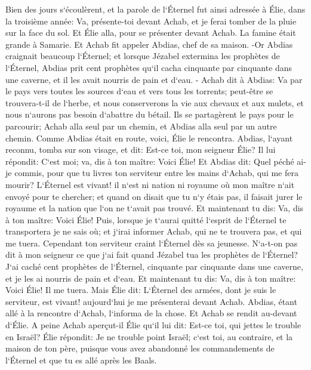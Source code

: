 \verse Bien des jours s`écoulèrent, et la parole de l`Éternel fut ainsi adressée à Élie, dans la troisième année: Va, présente-toi devant Achab, et je ferai tomber de la pluie sur la face du sol. 
\verse Et Élie alla, pour se présenter devant Achab. La famine était grande à Samarie. 
\verse Et Achab fit appeler Abdias, chef de sa maison. -Or Abdias craignait beaucoup l`Éternel; 
\verse et lorsque Jézabel extermina les prophètes de l`Éternel, Abdias prit cent prophètes qu`il cacha cinquante par cinquante dans une caverne, et il les avait nourris de pain et d`eau. - 
\verse Achab dit à Abdias: Va par le pays vers toutes les sources d`eau et vers tous les torrents; peut-être se trouvera-t-il de l`herbe, et nous conserverons la vie aux chevaux et aux mulets, et nous n`aurons pas besoin d`abattre du bétail. 
\verse Ils se partagèrent le pays pour le parcourir; Achab alla seul par un chemin, et Abdias alla seul par un autre chemin. 
\verse Comme Abdias était en route, voici, Élie le rencontra. Abdias, l`ayant reconnu, tomba sur son visage, et dit: Est-ce toi, mon seigneur Élie? 
\verse Il lui répondit: C`est moi; va, dis à ton maître: Voici Élie! 
\verse Et Abdias dit: Quel péché ai-je commis, pour que tu livres ton serviteur entre les mains d`Achab, qui me fera mourir? 
\verse L`Éternel est vivant! il n`est ni nation ni royaume où mon maître n`ait envoyé pour te chercher; et quand on disait que tu n`y étais pas, il faisait jurer le royaume et la nation que l`on ne t`avait pas trouvé. 
\verse Et maintenant tu dis: Va, dis à ton maître: Voici Élie! 
\verse Puis, lorsque je t`aurai quitté l`esprit de l`Éternel te transportera je ne sais où; et j`irai informer Achab, qui ne te trouvera pas, et qui me tuera. Cependant ton serviteur craint l`Éternel dès sa jeunesse. 
\verse N`a-t-on pas dit à mon seigneur ce que j`ai fait quand Jézabel tua les prophètes de l`Éternel? J`ai caché cent prophètes de l`Éternel, cinquante par cinquante dans une caverne, et je les ai nourris de pain et d`eau. 
\verse Et maintenant tu dis: Va, dis à ton maître: Voici Élie! Il me tuera. 
\verse Mais Élie dit: L`Éternel des armées, dont je suis le serviteur, est vivant! aujourd`hui je me présenterai devant Achab. 
\verse Abdias, étant allé à la rencontre d`Achab, l`informa de la chose. Et Achab se rendit au-devant d`Élie. 
\verse A peine Achab aperçut-il Élie qu`il lui dit: Est-ce toi, qui jettes le trouble en Israël? 
\verse Élie répondit: Je ne trouble point Israël; c`est toi, au contraire, et la maison de ton père, puisque vous avez abandonné les commandements de l`Éternel et que tu es allé après les Baals. 
